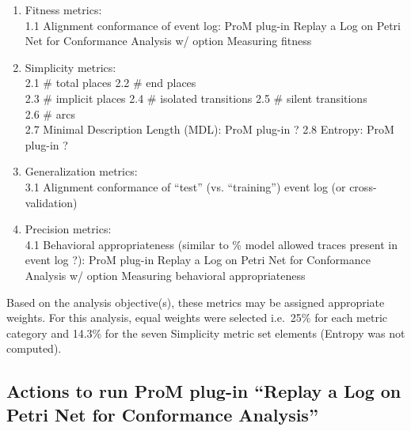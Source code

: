 \documentclass[]{article}
\begin{document}
\begin{enumerate}
\def\labelenumi{\arabic{enumi}.}
\item
  Fitness metrics:\\1.1 Alignment conformance of event log: ProM plug-in
  Replay a Log on Petri Net for Conformance Analysis w/ option Measuring
  fitness
\item
  Simplicity metrics:\\2.1 \# total places 2.2 \# end places\\2.3 \#
  implicit places 2.4 \# isolated transitions 2.5 \# silent
  transitions\\2.6 \# arcs\\2.7 Minimal Description Length (MDL): ProM
  plug-in ? 2.8 Entropy: ProM plug-in ?
\item
  Generalization metrics:\\3.1 Alignment conformance of ``test'' (vs.
  ``training'') event log (or cross-validation)
\item
  Precision metrics:\\4.1 Behavioral appropriateness (similar to \%
  model allowed traces present in event log ?): ProM plug-in Replay a
  Log on Petri Net for Conformance Analysis w/ option Measuring
  behavioral appropriateness
\end{enumerate}

Based on the analysis objective(s), these metrics may be assigned
appropriate weights. For this analysis, equal weights were selected
i.e.~25\% for each metric category and 14.3\% for the seven Simplicity
metric set elements (Entropy was not computed).

\subsection{Actions to run ProM plug-in ``Replay a Log on Petri Net for
Conformance
Analysis''}\label{actions-to-run-prom-plug-in-replay-a-log-on-petri-net-for-conformance-analysis}
\end{document}
